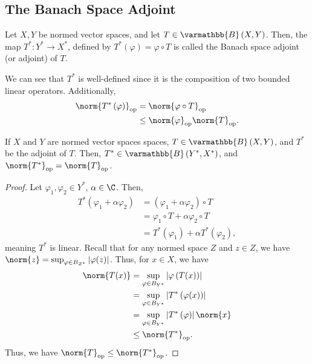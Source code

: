 \documentclass[10pt]{mypackage}
\renewcommand*{\mathbb}[1]{\varmathbb{#1}}
\newcommand{\B}{\mathbb{B}}
\begin{document}
\subsection{The Banach Space Adjoint}%
\begin{definition}
  Let $X,Y$ be normed vector spaces, and let $T\in \B\left(X,Y\right)$. Then, the map $T^{\ast}:Y^{\ast}\rightarrow X^{\ast}$, defined by $T^{\ast}\left(\varphi\right) = \varphi\circ T$ is called the Banach space adjoint (or adjoint) of $T$.
\end{definition}
We can see that $T^{\ast}$ is well-defined since it is the composition of two bounded linear operators. Additionally,
\begin{align*}
  \norm{T^{\ast}\left(\varphi\right)}_{\text{op}} &= \norm{\varphi\circ T}_{\text{op}}\\
                                                  &\leq \norm{\varphi}_{\text{op}}\norm{T}_{\text{op}}.
\end{align*}
\begin{proposition}
  If $X$ and $Y$ are normed vector spaces spaces, $T\in \B\left(X,Y\right)$, and $T^{\ast}$ be the adjoint of $T$. Then, $T^{\ast}\in \B\left(Y^{\ast},X^{\ast}\right)$, and $\norm{T^{\ast}}_{\text{op}} = \norm{T}_{\text{op}}$.
\end{proposition}
\begin{proof}
  Let $\varphi_1,\varphi_2\in Y^{\ast}$, $\alpha \in \C$. Then,
  \begin{align*}
    T^{\ast}\left(\varphi_1 + \alpha\varphi_2\right) &= \left(\varphi_1 + \alpha\varphi_2\right)\circ T\\
                                                     &= \varphi_1\circ T + \alpha\varphi_2\circ T\\
                                                     &= T^{\ast}\left(\varphi_1\right) + \alpha T^{\ast}\left(\varphi_2\right),
  \end{align*}
  meaning $T^{\ast}$ is linear. Recall that for any normed space $Z$ and $z\in Z$, we have $\norm{z} = \sup_{\varphi\in B_{Z^{\ast}}}\left\vert \varphi(z) \right\vert$. Thus, for $x\in X$, we have
  \begin{align*}
    \norm{T(x)} &= \sup_{\varphi\in B_{Y^{\ast}}}\left\vert \varphi\left(T(x)\right) \right\vert\\
                &= \sup_{\varphi\in B_{Y^{\ast}}}\left\vert T^{\ast}\left(\varphi(x)\right) \right\vert\\
                &= \sup_{\varphi\in B_{Y^{\ast}}}\left\vert T^{\ast}\left(\varphi\right) \right\vert\norm{x}\\
                &\leq \norm{T^{\ast}}_{\text{op}}.
  \end{align*}
  Thus, we have $\norm{T}_{\text{op}}\leq \norm{T^{\ast}}_{\text{op}}$.
\end{proof}
\end{document}
